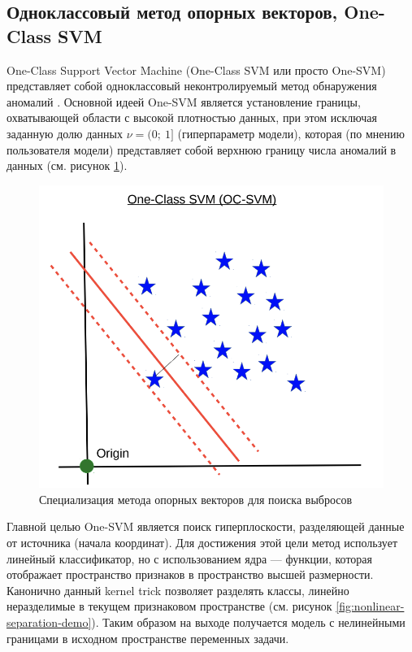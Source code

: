 \subsection{Одноклассовый метод опорных векторов, One-Class SVM}

One-Class Support Vector Machine (One-Class SVM или просто One-SVM) представляет собой одноклассовый неконтролируемый метод обнаружения аномалий \cite{Skilear-One-Class-SVM-Doc}. Основной идеей One-SVM является установление границы, охватывающей области с высокой плотностью данных, при этом исключая заданную долю данных $\nu = (0;\ 1]$ (гиперпараметр модели), которая (по мнению пользователя модели) представляет собой верхнюю границу числа аномалий в данных (см. рисунок \ref{fig:one-class-svm}).

\begin{figure}
  \centering
  \includegraphics[scale=0.5]{inc/images/one-class-svm.png}
  \caption{Специализация метода опорных векторов для поиска выбросов \cite{SVM-Lecture}}
  \label{fig:one-class-svm}
\end{figure}

Главной целью One-SVM является поиск гиперплоскости, разделяющей данные от источника (начала координат). Для достижения этой цели метод использует линейный классификатор, но с использованием ядра --- функции, которая отображает пространство признаков в пространство высшей размерности. Канонично данный kernel trick \cite{Anomaly-Detection-One-Class-SVM} позволяет разделять классы, линейно неразделимые в текущем признаковом пространстве (см. рисунок \ref{fig:nonlinear-separation-demo}). Таким образом на выходе получается модель с нелинейными границами в исходном пространстве переменных задачи.

